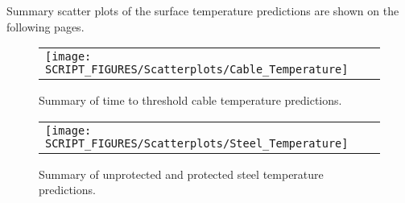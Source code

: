 Summary scatter plots of the surface temperature predictions are shown on the following pages.

\begin{figure}[ht]
\begin{center}
\begin{tabular}{l}
\texttt{[image: SCRIPT\_FIGURES/Scatterplots/Cable\_Temperature]}
\end{tabular}
\end{center}
\caption[Summary of time to threshold cable temperature predictions]
{Summary of time to threshold cable temperature predictions.}
\label{Surface_Temperature_THIEF_Summary}
\end{figure}

\begin{figure}[p]
\begin{center}
\begin{tabular}{l}
\texttt{[image: SCRIPT\_FIGURES/Scatterplots/Steel\_Temperature]}
\end{tabular}
\end{center}
\caption[Summary of steel temperature predictions]
{Summary of unprotected and protected steel temperature predictions.}
\label{Surface_Temperature_Steel_Summary}
\end{figure}

